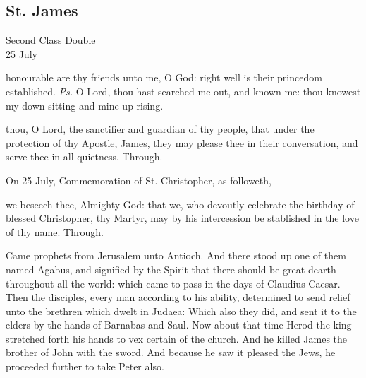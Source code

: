 \subsection{St. James}
\begin{inhead}
    {Second Class Double\\
25 July}
\end{inhead}

\introit
{} honourable are thy friends unto me, O God: right well is their princedom established. \textit{Ps.} O Lord, thou hast searched me out, and known me: thou knowest my down-sitting and mine up-rising.

\collect
 thou, O Lord, the sanctifier and guardian of thy people, that under the protection of thy Apostle, James, they may please thee in their conversation, and serve thee in all quietness. Through.
\begin{rubric}
	 On 25 July, Commemoration of St. Christopher, as followeth,
\end{rubric}
 we beseech thee, Almighty God: that we, who devoutly celebrate the birthday of blessed Christopher, thy Martyr, may by his intercession be stablished in the love of thy name. Through.

 Came prophets from Jerusalem unto Antioch. And there stood up one of them named Agabus, and signified by the Spirit that there should be great dearth throughout all the world: which came to pass in the days of Claudius Caesar. Then the disciples, every man according to his ability, determined to send relief unto the brethren which dwelt in Judaea: Which also they did, and sent it to the elders by the hands of Barnabas and Saul. Now about that time Herod the king stretched forth his hands to vex certain of the church. And he killed James the brother of John with the sword. And because he saw it pleased the Jews, he proceeded further to take Peter also.


